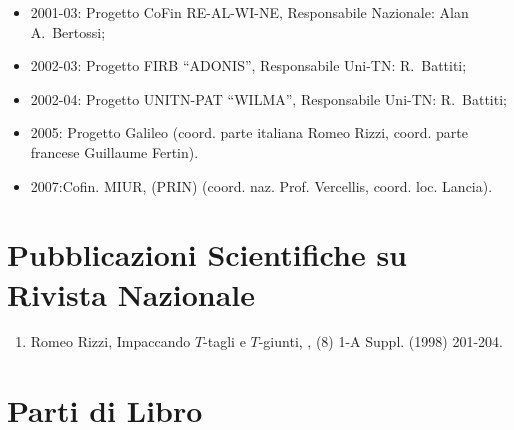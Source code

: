 \documentclass[11pt]{article}
\begin{document}
\medskip

\begin{itemize}
\item 2001-03:
      Progetto CoFin RE-AL-WI-NE,
      Responsabile Nazionale: Alan  A.~Bertossi;
\item 2002-03:
      Progetto FIRB ``ADONIS'',
      Responsabile Uni-TN: R.~Battiti;
\item 2002-04:
      Progetto UNITN-PAT ``WILMA'',
      Responsabile Uni-TN: R.~Battiti;
\item 2005:
      Progetto Galileo (coord. parte italiana Romeo Rizzi,
                        coord. parte francese Guillaume Fertin).
\item 2007:Cofin. MIUR, (PRIN)
      (coord. naz. Prof. Vercellis, coord. loc. Lancia).
\end{itemize}


\section{Pubblicazioni Scientifiche su Rivista Nazionale}


\begin{enumerate}
  \item {\sc Romeo Rizzi},
   \newblock  Impaccando $T$-tagli e $T$-giunti,
   ,
             (8) 1-A Suppl. (1998) 201-204.

\end{enumerate}

\section{Parti di Libro}
\end{document}
